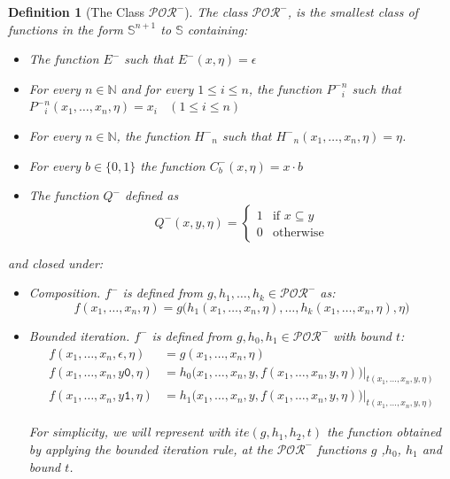 \documentclass[10pt]{amsart}
\newcommand{\POR}{\mathcal{POR}}
\newcommand{\NN}{\mathbb{N}}
\renewcommand{\SS}{\mathbb{S}}
\newcommand{\subo}{\eta}
\newtheorem{defn}{Definition}
\begin{document}
\begin{defn}[The Class $\POR^-$]
The class $\POR^-$,
is the smallest class of functions in the form $\SS^{n+1}$
to $\SS$ containing:
\begin{itemize}
\item The function $E^-$ such that $E^-(x,\subo)=\epsilon$
\item For every $n\in\NN$ and for every $1\leq i\leq n$,
the function ${P^-}^n_i$ such that ${P^-}^n_i(x_1,\dots, x_n,\subo) = x_i$ \ $(1\leq i\leq
n)$
\item For every $n\in\NN$, the function ${H^-}_n$ such that ${H^-}_n(x_1,\dots, x_n,\subo) = \subo$.
\item For every $b\in\{0,1\}$ the function $C^-_b(x,\subo)=x\cdot b$
\item The function $Q^-$ defined as
$$
Q^-(x,y, \subo)=\left\{\begin{array}{ll}
	1 & \mbox{if }x\subseteq y \\
	0 & \mbox{otherwise}
\end{array}\right.
$$
\end{itemize}
and closed under:
\begin{itemize}
\item Composition. $f^-$ is defined from $g,h_1,\dots, h_k\in \POR^-$ as:
$$
f(x_1,\dots, x_n,\subo)=g\big(h_1(x_1,\dots, x_n,\subo),\dots, h_k(x_1,\dots,
x_n,\subo),\subo\big)
$$
\item Bounded iteration. $f^-$ is defined from $g,h_0,h_1 \in \POR^-$
with bound $t$:
\begin{align*}
f(x_1,\dots, x_n,\epsilon, \subo) &= g(x_1,\dots, x_n,\subo) \\
f(x_1,\dots, x_n,y\mathtt{0},\subo) &= h_0\big(x_1,\dots, x_n,y, f(x_1,\dots, x_n,y,\subo)\big) |_{t(x_1,\dots, x_n,y,\subo)} \\
f(x_1,\dots, x_n,y\mathtt{1},\subo) &= h_1\big(x_1,\dots, x_n,y,f(x_1,\dots, x_n,y,\subo)\big)|_{t(x_1,\dots, x_n,y,\subo)}
\end{align*}

For simplicity, we will represent with $ite(g, h_1, h_2, t)$ the function obtained by applying the bounded iteration rule, at the $\POR^-$ functions $g$ ,$h_0$, $h_1$ and bound $t$.
\end{itemize}
\end{defn}
\end{document}
